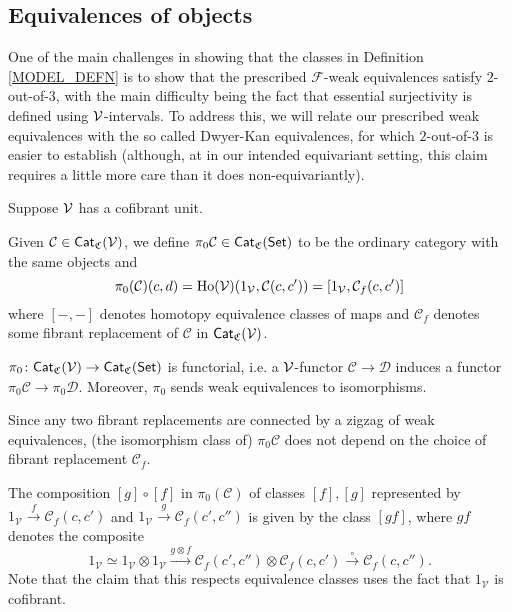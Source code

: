 \documentclass[a4paper,10pt
,draft
]{article}%
\renewcommand{\F}{\mathcal F}
\renewcommand{\1}{\eta}%
\begin{document}
\newpage

\subsection{Equivalences of objects}

One of the main challenges in showing that the classes in Definition \ref{MODEL_DEFN} is to show that the prescribed 
$\F$-weak equivalences satisfy $2$-out-of-$3$,
with the main difficulty being the fact that essential surjectivity is 
defined using $\mathcal V$-intervals.
To address this, we will relate our prescribed weak equivalences
with the so called Dwyer-Kan equivalences,
for which $2$-out-of-$3$ is easier to establish
(although, at in our intended equivariant setting, 
this claim requires a little more care than it does non-equivariantly).



\begin{definition}\label{HTPY_DEFN}
	Suppose $\mathcal V$ has a cofibrant unit.

	Given $\mathcal C \in \mathsf{Cat}_{\mathfrak{C}}(\mathcal V)$,
	we define $\pi_0 \mathcal C \in \mathsf{Cat}_{\mathfrak{C}}(\mathsf{Set})$ 
	to be the ordinary category with the same objects and
\[
	\pi_0(\mathcal{C})(c,d)=
	\operatorname{Ho}(\mathcal V)(1_{\mathcal V}, \mathcal C(c,c'))=
	[1_{\mathcal V}, \mathcal{C}_f(c,c')]
\]
where $[-,-]$ denotes homotopy equivalence classes of maps
and $\mathcal{C}_f$ denotes some fibrant replacement of
$\mathcal C$ in $\mathsf{Cat}_{\mathfrak{C}}(\mathcal V)$.
\end{definition}


\begin{remark}
$\pi_0\colon \mathsf{Cat}_{\mathfrak{C}}(\mathcal V)
\to \mathsf{Cat}_{\mathfrak{C}}(\mathsf{Set})$ is functorial,
i.e. a $\mathcal V$-functor
$\mathcal{C} \to \mathcal{D}$
induces a functor 
$\pi_0\mathcal{C} \to \pi_0\mathcal{D}$.
Moreover, $\pi_0$ sends weak equivalences to isomorphisms.
\end{remark}

\begin{remark}
Since any two fibrant replacements are connected by a zigzag of weak equivalences,
(the isomorphism class of) $\pi_0 \mathcal{C}$ does not depend on the choice of fibrant replacement $\mathcal{C}_f$.
\end{remark}



\begin{remark}
The composition $[g]\circ [f]$
in $\pi_0(\mathcal{C})$
of classes $[f],[g]$
represented by
$1_{\mathcal{V}} \xrightarrow{f} \mathcal{C}_f({c,c'})$
and 
$1_{\mathcal{V}} \xrightarrow{g} \mathcal{C}_f({c',c''})$
is given by the class $[gf]$, where $gf$ denotes the composite
\[
	1_{\mathcal{V}} \simeq
	1_{\mathcal{V}} \otimes 1_{\mathcal{V}} \xrightarrow{g \otimes f}
	\mathcal{C}_f({c',c''}) \otimes  \mathcal{C}_f({c,c'}) \xrightarrow{\circ}
	\mathcal{C}_f({c,c''}).
\]
Note that the claim that this respects equivalence classes uses the fact that $1_{\mathcal{V}}$ is cofibrant.
\end{remark}
\end{document}
